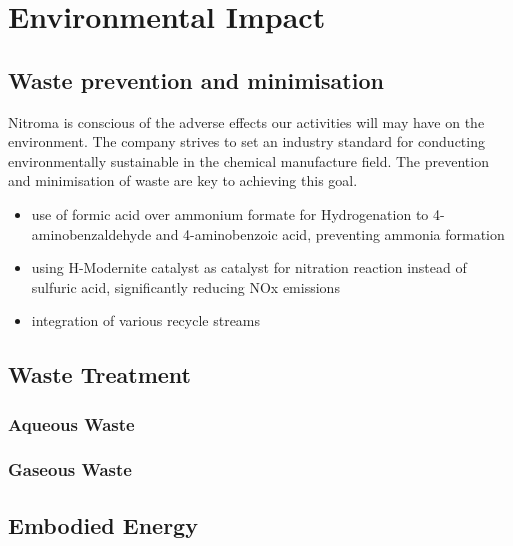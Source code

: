 \section{Environmental Impact}

\subsection{Waste prevention and minimisation }

Nitroma is conscious of the adverse effects our activities will may have on the environment. The company strives to set an industry standard for conducting environmentally sustainable in the chemical manufacture field. The prevention and minimisation of waste are key to achieving this goal. 

\begin{itemize}
    \item use of formic acid over ammonium formate for Hydrogenation to 4-aminobenzaldehyde and 4-aminobenzoic acid, preventing ammonia formation 
    \item using H-Modernite catalyst as catalyst for nitration reaction instead of sulfuric acid, significantly reducing NOx emissions
    \item integration of various recycle streams
\end{itemize}

\subsection{Waste Treatment}

\subsubsection{Aqueous Waste}


\subsubsection{Gaseous Waste}

\subsection{Embodied Energy}